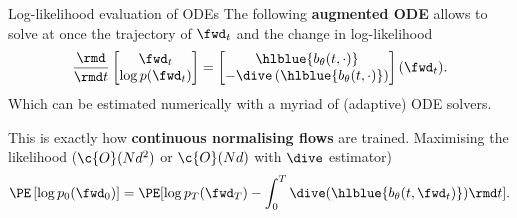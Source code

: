 \begin{frame}{Log-likelihood evaluation of ODEs}
The following \textbf{augmented ODE} allows to solve at once the trajectory of $\fwd_t$ and the change in log-likelihood
\begin{equation}
    \frac{\rmd}{\rmd t} 
    \begin{bmatrix} \fwd_t \\ \log p(\fwd_t) \end{bmatrix}
    = {\begin{bmatrix} \hlblue{b_\theta(t, \cdot)} \\ -\dive\left(\hlblue{b_\theta(t, \cdot)} \right) \end{bmatrix}(\fwd_t)}.
\end{equation}
Which can be estimated numerically with a myriad of (adaptive) ODE solvers.
\pause

This is exactly how \textbf{continuous normalising flows} \cite{chen2018neural,grathwohl2019Scalable} are trained.
Maximising the likelihood ($\c{O}(Nd^2)$ or $\c{O}(Nd)$ with $\dive$ estimator)
\begin{equation}
    \PE \left[ \log p_0(\fwd_0) \right] = \PE [  \log p_T(\fwd_T) - \int_0^T \dive( \hlblue{b_\theta(t, \fwd_t)}) \rmd t ].
\end{equation}
%
\end{frame}

